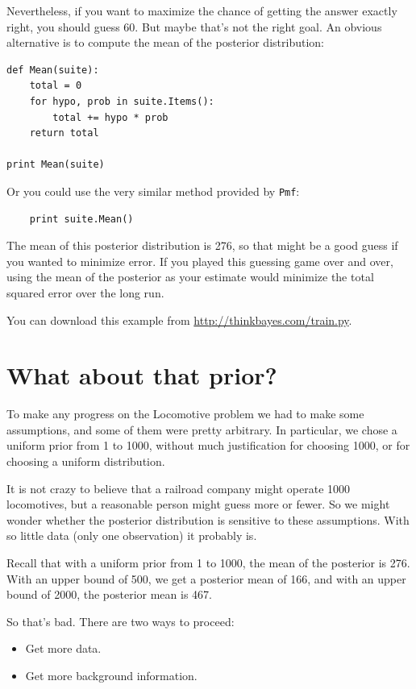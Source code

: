 \documentclass[12pt]{book}
\begin{document}
Nevertheless, if you want to maximize the chance of getting
the answer exactly right, you should guess 60.  But maybe that's
not the right goal.  An obvious alternative is to compute the
mean of the posterior distribution:

\begin{verbatim}
def Mean(suite):
    total = 0
    for hypo, prob in suite.Items():
        total += hypo * prob
    return total

print Mean(suite)
\end{verbatim}

Or you could use the very similar method provided by {\tt Pmf}:

\begin{verbatim}
    print suite.Mean()
\end{verbatim}

The mean of this posterior distribution is 276, so that might be a
good guess if you wanted to minimize error.  If you played this
guessing game over and over, using the mean of the posterior as your
estimate would minimize the total squared error over the long run.

You can download this example from \url{http://thinkbayes.com/train.py}.


\section{What about that prior?}

To make any progress on the Locomotive problem we had to make
some assumptions, and some of them were pretty arbitrary.  In
particular, we chose a uniform prior from 1 to 1000, without
much justification for choosing 1000, or for choosing a uniform
distribution.

It is not crazy to believe that a railroad company might operate
1000 locomotives, but a reasonable person might guess more or fewer.
So we might wonder whether the posterior distribution is sensitive
to these assumptions.  With so little data (only one observation)
it probably is.

Recall that with a uniform prior from 1 to 1000, the mean of
the posterior is 276.  With an upper bound of 500, we get a
posterior mean of 166, and with an upper bound of 2000,
the posterior mean is 467.

So that's bad.  There are two ways to proceed:

\begin{itemize}

\item Get more data.

\item Get more background information.

\end{itemize}
\end{document}
